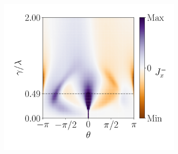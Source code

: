\begin{figure}[h!]
\begin{minipage}[h!]{1\textwidth}
\begin{subfigure}[b!]{0.35 \textwidth}
             \label{}
         \end{subfigure}\hspace*{-0.5em}
         \begin{subfigure}[b!]{0.35 \textwidth}
             \caption{}
             \includegraphics[width=\textwidth]{Imagenes/Resultados_pump_Fractal/x/current_square_pump_negx.pdf}
             \label{}
         \end{subfigure}\hspace*{-0.5em}
     \end{minipage}\vspace*{-1em}
     

\end{figure}
